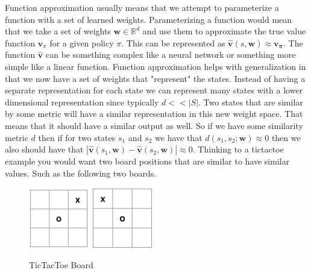 Function approximation usually means that we attempt to parameterize a function with a set of learned weights. Parameterizing a function would mean that we take a set of weights $\mathbf{w} \in \mathbb{R}^{d} $ and use them to approximate the true value function $\mathbf{v}_{\pi}$ for a given policy $\pi$. This can be represented as $\hat{\mathbf{v}}(s,\mathbf{w}) \approx \mathbf{v_{\pi}}$. The function $\hat{\mathbf{v}}$ can be something complex like a neural network or something more simple like a linear function. Function approximation helps with generalization in that we now have a set of weights that "represent" the states. Instead of having a separate representation for each state we can represent many states with a lower dimensional representation since typically $d << |S|$. Two states that are similar by some metric will have a similar representation in this new weight space. That means that it should have a similar output as well. So if we have some similarity metric $d$ then if for two states $s_{1}$ and $s_{2}$ we have that $d(s_{1},s_{2}; \mathbf{w}) \approx 0$ then we also should have that $ | \hat{\mathbf{v}}(s_{1},\mathbf{w}) - \hat{\mathbf{v}}(s_{2},\mathbf{w}) | \approx 0$. Thinking to a tictactoe example you would want two board positions that are similar to have similar values. Such as the following two boards. 

\begin{figure}[H]
    \centering
    \includegraphics[width=100px,height=100px]{images/t_board_0.png}
    \includegraphics[width=100px,height=100px]{images/t_board_1.png}
    \caption{TicTacToe Board}
    \label{fig:my_label}
\end{figure}
    
